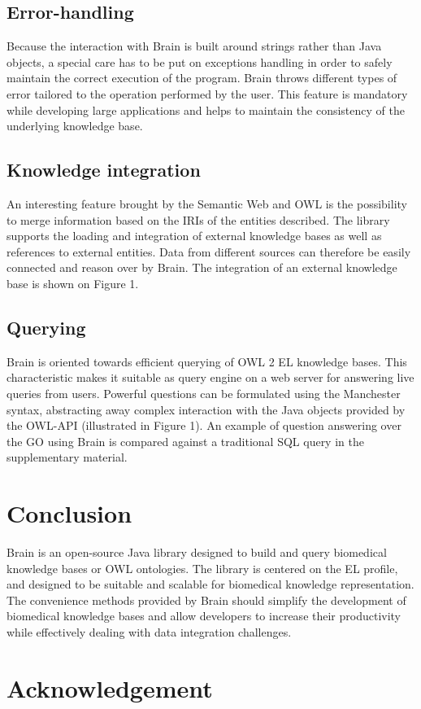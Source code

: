 \documentclass{bioinfo}
\begin{document}
\subsection{Error-handling}
Because the interaction with Brain is built around strings rather than Java objects, a special care has to be put on
exceptions handling in order to safely maintain the correct execution of the program. Brain throws different types of error tailored 
to the operation performed by the user. This feature is mandatory while developing large applications and helps to maintain the consistency
 of the underlying knowledge base.
\subsection{Knowledge integration}
An interesting feature brought by the Semantic Web and OWL is the possibility to merge information based
on the IRIs of the entities described. The library supports the loading and integration of external knowledge bases as well as 
references to external entities. Data from different sources can therefore be easily connected and reason over by Brain. The integration
of an external knowledge base is shown on Figure 1.
\subsection{Querying}
Brain is oriented towards efficient querying of OWL 2 EL knowledge bases.
This characteristic makes it suitable as query engine on a web server for
answering live queries from users.
Powerful questions can be formulated using the Manchester syntax, abstracting
away complex interaction with the Java objects provided by the OWL-API (illustrated in Figure 1).
An example of question answering over the GO using Brain
is compared against a traditional SQL query in the supplementary material.
\section{Conclusion}
Brain is an open-source Java library designed to build and query biomedical knowledge bases or OWL ontologies.
The library is centered on the EL profile, and designed to be suitable and scalable for biomedical knowledge representation.
The convenience methods provided by Brain should simplify the development of biomedical knowledge bases and allow developers
to increase their productivity while effectively dealing with data integration challenges.

\section*{Acknowledgement}
\end{document}
